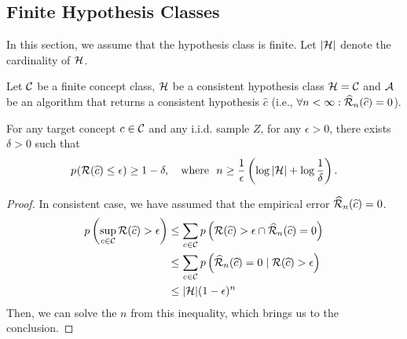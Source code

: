 \subsection{Finite Hypothesis Classes}
In this section, we assume that the hypothesis class is finite.  Let $|\mathcal{H}|$ denote the cardinality of $\mathcal{H}$.
\begin{theorem}
	Let $\mathcal{C}$ be a finite concept class, $\mathcal{H}$ be a consistent hypothesis class  $\mathcal{H} = \mathcal{C}$ and $\mathcal{A}$ be an algorithm that returns a consistent hypothesis $\widehat{c}$ (i.e., $\forall n < \infty: \widehat{\mathcal{R}}_n(\widehat{c}) = 0$).
	
	For any target concept $c \in \mathcal{C}$ and any i.i.d. sample $Z$, for any $\epsilon > 0$, there exists $\delta > 0$ such that
	\begin{equation}
		p_{}({\mathcal{R}}(\widehat{c}) \leq \epsilon) \geq 1 - \delta, \quad \text{where}\ \  n \geq \frac{1}{\epsilon}\left( \log |\mathcal{H}| + \log \frac{1}{\delta} \right).
	\end{equation}
\end{theorem}
\begin{proof}
In consistent case, we have assumed that the empirical error $\widehat{\mathcal{R}}_n(\widehat{c}) = 0$.
\begin{align}
	p\left( \sup_{c \in \mathcal{C}} {\mathcal{R}}(\widehat{c}) > \epsilon \right) & \leq \sum_{c \in \mathcal{C}}  p\left( {\mathcal{R}}(\widehat{c}) > \epsilon  \cap \widehat{\mathcal{R}}_n(\widehat{c}) = 0 \right) \\
	& \leq \sum_{c \in \mathcal{C}}  p\left( \widehat{\mathcal{R}}_n(\widehat{c}) = 0 \mid {\mathcal{R}}(\widehat{c}) > \epsilon \right) \\
	& \leq |\mathcal{H}| (1 - \epsilon)^n
\end{align}
Then, we can solve the $n$ from this inequality, which brings us to the conclusion.
\end{proof}


